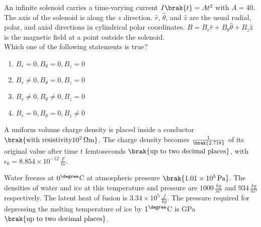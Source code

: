 \iffalse
                       
                        
                        
                        
                    
                        \author{AI24BTECH11006 - Bugada Roopansha}
                        \section{ph}
                        \chapter{2017}
                        \fi
 
    \item 
    An infinite solenoid carries a time-varying current $I\brak{t} = At^2$ with $A = 40$. The axis of the solenoid is along the $z$ direction. $\hat{r}$, $\hat{\theta}$, and $\hat{z}$ are the usual radial, polar, and axial directions in cylindrical polar coordinates. $B = B_r \hat{r} + B_\theta \hat{\theta} + B_z \hat{z}$ is the magnetic field at a point outside the solenoid. \\
    Which one of the following statements is true?
    \begin{enumerate}
        \item $B_r = 0, B_\theta = 0, B_z = 0$
        \item $B_r \neq 0, B_\theta = 0, B_z = 0$
        \item $B_r \neq 0, B_\theta \neq 0, B_z = 0$
        \item $B_r = 0, B_\theta = 0, B_z \neq 0$
    \end{enumerate}
    
    \item 

    A uniform volume charge density is placed inside a conductor $\brak{\text{with resistivity} 10^2 \, \Omega \text{m}}$. The charge density becomes $\frac{1}{\brak{2.718}}$ of its original value after time $t$ femtoseconds $\brak{\text{up to two decimal places}}$, with $\epsilon_0 = 8.854 \times 10^{-12} \, \frac{F}{m}$.
    
    \item 
    Water freezes at $0^{\degree} $C at atmospheric pressure $\brak{1.01 \times 10^5 \, \text{Pa}}$. The densities of water and ice at this temperature and pressure are $1000 \, \frac {kg}{m^3}$ and $934 \, \frac{kg}{m^3}$ respectively. The latent heat of fusion is $3.34 \times 10^5 \, \frac{J}{kg}$. The pressure required for depressing the melting temperature of ice by $1^{\degree} $C is  GPa $\brak{\text{up to two decimal places}}$.
    
